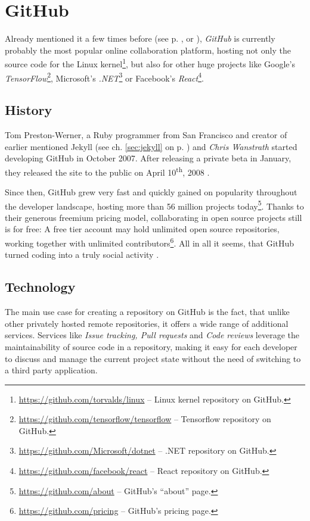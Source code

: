 \section{GitHub}
\label{sec:git-github}

Already mentioned it a few times before (see p. \pageref{sec:jekyll}, \pageref{sec:buildpipelines-markdown} or \pageref{sec:git}), \emph{GitHub} is currently probably the most popular online collaboration platform, hosting not only the source code for the Linux kernel\footnote{\url{https://github.com/torvalds/linux} -- Linux kernel repository on GitHub.}, but also for other huge projects like Google's \emph{TensorFlow}\footnote{\url{https://github.com/tensorflow/tensorflow} -- Tensorflow repository on GitHub.}, Microsoft's \emph{.NET}\footnote{\url{https://github.com/Microsoft/dotnet} -- .NET repository on GitHub.} or Facebook's \emph{React}\footnote{\url{https://github.com/facebook/react} -- React repository on GitHub.}.

\subsection{History}
\label{sec:github-history}
Tom Preston-Werner, a Ruby programmer from San Francisco and creator of earlier mentioned Jekyll (see ch. \ref{sec:jekyll} on p. \pageref{sec:jekyll}) and \emph{Chris Wanstrath} started developing GitHub in October 2007. After releasing a private beta in January, they released the site to the public on April 10\textsuperscript{th}, 2008 \cite{PrestonWerner2008githublaunch}.

Since then, GitHub grew very fast and quickly gained on popularity throughout the developer landscape, hosting more than 56 million projects today\footnote{\url{https://github.com/about} -- GitHub's ``about'' page.}. Thanks to their generous freemium pricing model, collaborating in open source projects still is for free: A free tier account may hold unlimited open source repositories, working together with unlimited contributors\footnote{\url{https://github.com/pricing} -- GitHub's pricing page.}. All in all it seems, that GitHub turned coding into a truly social activity \cite[416]{loeliger2012version}.

\subsection{Technology}
The main use case for creating a repository on GitHub is the fact, that unlike other privately hosted remote repositories, it offers a wide range of additional services. Services like \emph{Issue tracking, Pull requests} and \emph{Code reviews} leverage the maintainability of source code in a repository, making it easy for each developer to discuss and manage the current project state without the need of switching to a third party application.

